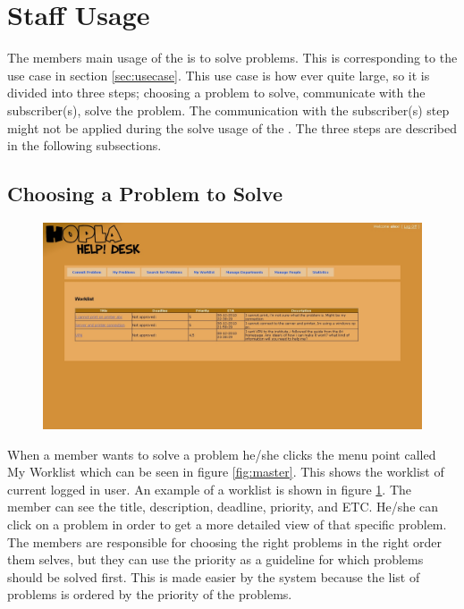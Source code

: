 \section{Staff Usage}
\label{sec:staff_usage}
The \astaff[] members main usage of the is to solve problems.
This is corresponding to the \ucsolproblem{} use case in section \ref{sec:usecase}.
This use case is how ever quite large, so it is divided into three steps; choosing a problem to solve, communicate with the subscriber(s), solve the problem.
The communication with the subscriber(s) step might not be applied during the solve usage of the \aclient[].
The three steps are described in the following subsections.

\subsection{Choosing a Problem to Solve}
\begin{figure}[htb]
	\centering
		\includegraphics[width=1.00\textwidth, clip=true, trim=4cm 10.5cm 8cm 8cm]{input/implementation/program_presentation/worklist.png}
	\label{fig:worklist}
\end{figure}

When a \astaff[] member wants to solve a problem he/she clicks the menu point called My Worklist which can be seen in figure \ref{fig:master}.
This shows the worklist of current logged in \astaff[] user.
An example of a worklist is shown in figure \ref{fig:worklist}.
The \astaff[] member can see the title, description, deadline, priority, and ETC.
He/she can click on a problem in order to get a more detailed view of that specific problem.
The \astaff[] members are responsible for choosing the right problems in the right order them selves, but they can use the priority as a guideline for which problems should be solved first.
This is made easier by the system because the list of problems is ordered by the priority of the problems.


